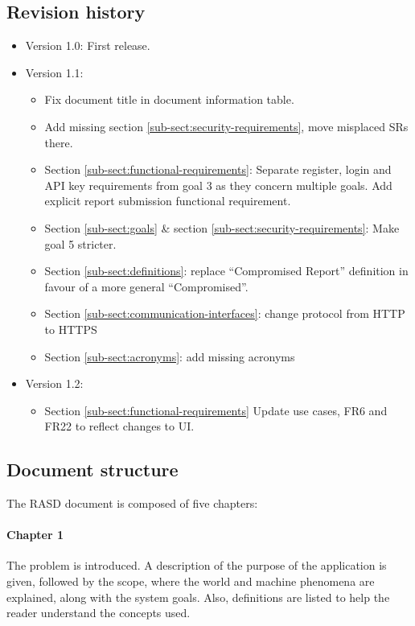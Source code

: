 \subsection{Revision history}
\begin{itemize}
    \item Version 1.0: First release.
    \item Version 1.1: 
        \begin{itemize}
            \item Fix document title in document information table.
            \item Add missing section \ref{sub-sect:security-requirements}, move misplaced SRs there.
            \item Section \ref{sub-sect:functional-requirements}: Separate register, login and API key requirements from goal 3 as they concern multiple goals. Add explicit report submission functional requirement.
            \item Section \ref{sub-sect:goals} \& section \ref{sub-sect:security-requirements}: Make goal 5 stricter.
            \item Section \ref{sub-sect:definitions}: replace “Compromised Report” definition in favour of a more general “Compromised”.
            \item Section \ref{sub-sect:communication-interfaces}: change protocol from HTTP to HTTPS
            \item Section \ref{sub-sect:acronyms}: add missing acronyms
        \end{itemize}
    \item Version 1.2:
        \begin{itemize}
            \item Section \ref{sub-sect:functional-requirements} Update use cases, FR6 and FR22 to reflect changes to UI.
        \end{itemize}
\end{itemize}

\subsection{Document structure}
The RASD document is composed of five chapters:

\paragraph{Chapter 1} The problem is introduced. A description of the purpose of the application is given, followed by the scope, where the world and machine phenomena are explained, along with the system goals. Also, definitions are listed to help the reader understand the concepts used.

